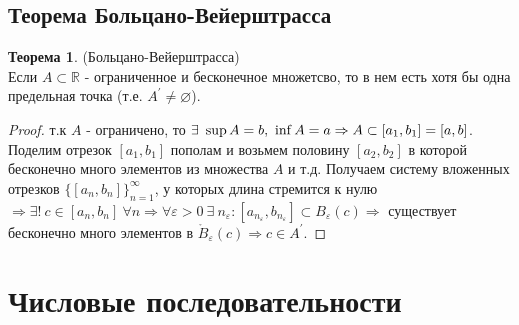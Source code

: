 \documentclass[a4paper, 12pt]{article}
\newcommand{\R}{\mathbb{R}}
\renewcommand{\epsilon}{\varepsilon}
\renewcommand{\emptyset}{\varnothing}
\theoremstyle{definition}
\newtheorem*{theorem}{Теорема}
\begin{document}
    \subsection{Теорема Больцано-Вейерштрасса}
        \begin{theorem} (Больцано-Вейерштрасса)\\
            Если $A\subset \R$ - ограниченное и бесконечное множетсво, то в нем есть хотя бы одна предельная точка (т.е. $A^{\prime}\ne \emptyset$).
        \end{theorem} 
        \begin{proof}
            т.к $A$ - ограничено, то $\exists\ \sup{A}=b,\ \inf{A}=a\\ \Rightarrow A\subset [a_1,b_1] = [a,b]$. Поделим отрезок $[a_1,b_1]$ пополам и возьмем половину $[a_2,b_2]$ в которой бесконечно много элементов из множества $A$ и т.д. Получаем систему вложенных отрезков $\{[a_n,b_n]\}_{n=1}^{\infty}$, у которых длина стремится к нулю $\Rightarrow \exists!\ c\in [a_n,b_n]\ \forall n\Rightarrow \forall \epsilon>0\ \exists\ n_{\epsilon}: [a_{n_{\epsilon}},b_{n_{\epsilon}}]\subset B_{\epsilon}(c) \Rightarrow$ существует бесконечно много элементов в $\mathring{B}_{\epsilon}(c)\Rightarrow c\in A^{\prime}$.
        \end{proof}
    \newpage
    \section{Числовые последовательности}
\end{document}
